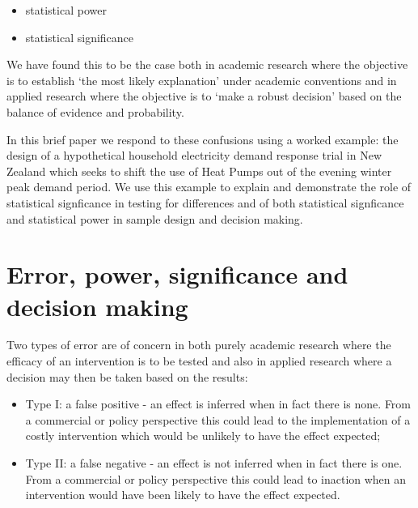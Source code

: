 \documentclass[]{article}
\providecommand{\tightlist}{%
  \setlength{\itemsep}{0pt}\setlength{\parskip}{0pt}}
\theoremstyle{definition}
\theoremstyle{definition}
\theoremstyle{definition}
\theoremstyle{remark}
\begin{document}
\begin{itemize}
\tightlist
\item
  statistical power
\item
  statistical significance
\end{itemize}

We have found this to be the case both in academic research where the
objective is to establish `the most likely explanation' under academic
conventions and in applied research where the objective is to `make a
robust decision' based on the balance of evidence and probability.

In this brief paper we respond to these confusions using a worked
example: the design of a hypothetical household electricity demand
response trial in New Zealand which seeks to shift the use of Heat Pumps
out of the evening winter peak demand period. We use this example to
explain and demonstrate the role of statistical signficance in testing
for differences and of both statistical signficance and statistical
power in sample design and decision making.

\section{Error, power, significance and decision
making}\label{error-power-significance-and-decision-making}

Two types of error are of concern in both purely academic research where
the efficacy of an intervention is to be tested and also in applied
research where a decision may then be taken based on the results:

\begin{itemize}
\tightlist
\item
  Type I: a false positive - an effect is inferred when in fact there is
  none. From a commercial or policy perspective this could lead to the
  implementation of a costly intervention which would be unlikely to
  have the effect expected;
\item
  Type II: a false negative - an effect is not inferred when in fact
  there is one. From a commercial or policy perspective this could lead
  to inaction when an intervention would have been likely to have the
  effect expected.
\end{itemize}
\end{document}
